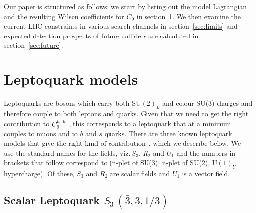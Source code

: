 \documentclass[12pt]{revtex4-2}
\numberwithin{equation}{section}
\begin{document}
Our paper is structured as follows: we start by listing out the model Lagrangian and the resulting Wilson coefficients for $C_9$ in section~\ref{sec:models}.  We then examine the current LHC constraints in various search channels in section~\ref{sec:limits} and expected detection prospects of future colliders are calculated in section~\ref{sec:future}.

 
\section{Leptoquark models}
\label{sec:models}

Leptoquarks are bosons which carry both SU$(2)_L$ and colour SU(3) charges and therefore couple to both leptons and quarks.  Given that we need to get the right contribution to $C_9^{\mu^+ \mu^-}$, this corresponds to a leptoquark that at a minimum couples to muons and to $b$ and $s$ quarks.  There are three known leptoquark models that give the right kind of contribution~\cite{Angelescu:2018tyl, Angelescu:2021lln, Becirevic:2016oho, Descotes-Genon:2015uva}, which we describe below.  We use the standard names for the fields, viz.\,$S_3$, $R_2$ and $U_1$ and the numbers in brackets that follow correspond to (n-plet of SU(3), n-plet of SU(2), U$(1)_Y$ hypercharge).  Of these, $S_3$ and $R_2$ are scalar fields and $U_1$ is a vector field.  



\subsection{Scalar Leptoquark $S_{3}\,(\bar{3},3,1/3)$}
\end{document}
